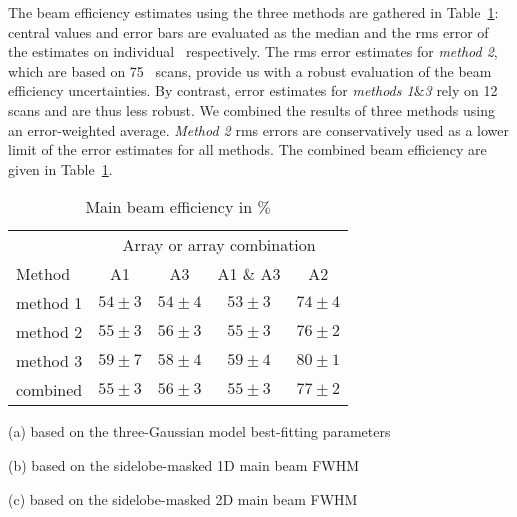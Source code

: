 The beam efficiency estimates using the three methods are gathered
in Table~\ref{tab:beam_efficiency}: central values and error
bars are evaluated as the median and the rms error of the
estimates on individual \bms\ respectively. The rms error estimates
for \emph{method 2}, which are based on 75 \bm\ scans, provide us with
a robust evaluation of the beam efficiency uncertainties. By contrast, error
estimates for \emph{methods 1$\&$3} rely on 12 scans and are thus less
robust. We combined the results of three methods using an error-weighted
average. \emph{Method 2} rms errors are conservatively used as a lower
limit of the error estimates for all methods. The combined beam
efficiency are given in Table~\ref{tab:beam_efficiency}.  

\begin{table}[!h]
  \caption[]{Main beam efficiency in $\%$}
  \begin{center}
  \begin{threeparttable}
    \renewcommand{\TPTminimum}{0.6\textwidth}
    {\centering
    \begin{tabular}{l|c|c|c|c}
      \hline\hline
      
      &    \multicolumn{4}{|c}{Array or array combination} \\
      \cline{2-5}
      Method & A1 &  A3 & A1 $\&$ A3 &  A2  \\
      \hline
      method 1\tnote{a} &  $54 \pm 3$  & $54 \pm 4$  &  $53 \pm 3$  &  $74 \pm 4$  \\
      method 2\tnote{b} &  $55 \pm 3$  & $56 \pm 3$  &  $55 \pm 3$  &  $76 \pm 2$  \\
        method 3\tnote{c} &  $59 \pm 7$  & $58 \pm 4$  &  $59 \pm 4$  &  $80 \pm 1$  \\
        combined          &  $55 \pm 3$  & $56 \pm 3$  &  $55 \pm 3$  &  $77 \pm 2$  \\
        \hline\hline
    \end{tabular}
    }
    \begin{tablenotes}
      \small
    \item[(a)] based on the three-Gaussian model best-fitting parameters
    \item[(b)] based on the sidelobe-masked 1D main beam FWHM 
    \item[(c)] based on the sidelobe-masked 2D main beam FWHM 
    \end{tablenotes}
  \end{threeparttable}
  \end{center}
  \label{tab:beam_efficiency}
\end{table}


